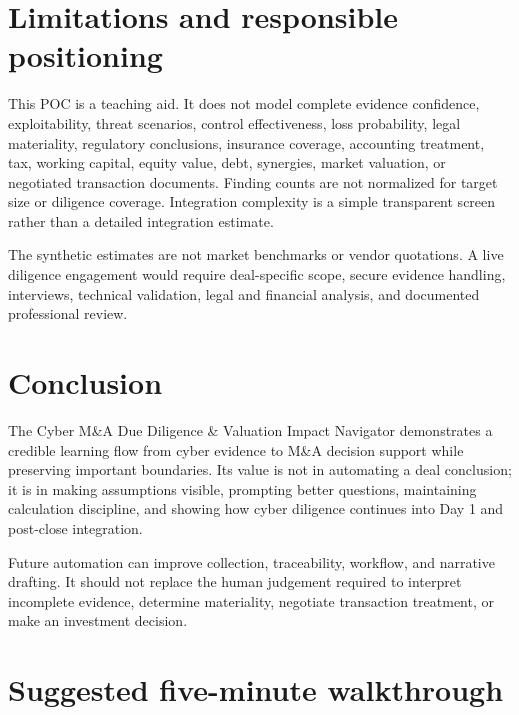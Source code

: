 \documentclass[11pt,a4paper]{article}
\newcommand{\poc}{Cyber M\&A Due Diligence \& Valuation Impact Navigator}
\begin{document}
\section{Limitations and responsible positioning}

This POC is a teaching aid. It does not model complete evidence confidence, exploitability, threat scenarios, control effectiveness, loss probability, legal materiality, regulatory conclusions, insurance coverage, accounting treatment, tax, working capital, equity value, debt, synergies, market valuation, or negotiated transaction documents. Finding counts are not normalized for target size or diligence coverage. Integration complexity is a simple transparent screen rather than a detailed integration estimate.

The synthetic estimates are not market benchmarks or vendor quotations. A live diligence engagement would require deal-specific scope, secure evidence handling, interviews, technical validation, legal and financial analysis, and documented professional review.

\section{Conclusion}

The \poc{} demonstrates a credible learning flow from cyber evidence to M\&A decision support while preserving important boundaries. Its value is not in automating a deal conclusion; it is in making assumptions visible, prompting better questions, maintaining calculation discipline, and showing how cyber diligence continues into Day 1 and post-close integration.

Future automation can improve collection, traceability, workflow, and narrative drafting. It should not replace the human judgement required to interpret incomplete evidence, determine materiality, negotiate transaction treatment, or make an investment decision.

\appendix
\section{Suggested five-minute walkthrough}
\end{document}
